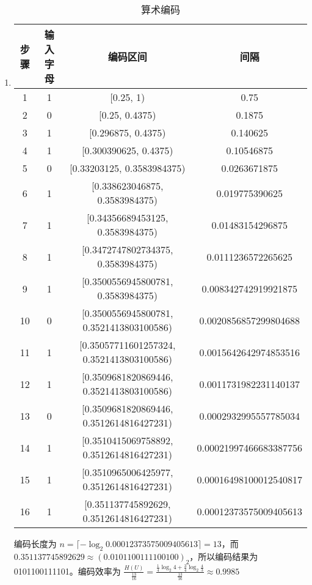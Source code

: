 \documentclass{ctexart}
\begin{document}
\begin{enumerate}
    \item\begin{table}[H]
        \centering
        \caption{算术编码}
        \begin{tabular}{cccc}
            \hline
            步骤 & 输入字母 & 编码区间 & 间隔 \\
            \hline
            1 & 1 & [0.25, 1) & 0.75 \\
            2 & 0 & [0.25, 0.4375) & 0.1875 \\
            3 & 1 & [0.296875, 0.4375) & 0.140625 \\
            4 & 1 & [0.300390625, 0.4375) & 0.10546875 \\
            5 & 0 & [0.33203125, 0.3583984375) & 0.0263671875 \\
            6 & 1 & [0.338623046875, 0.3583984375) & 0.019775390625 \\
            7 & 1 & [0.34356689453125, 0.3583984375) & 0.01483154296875 \\
            8 & 1 & [0.3472747802734375, 0.3583984375) & 0.0111236572265625 \\
            9 & 1 & [0.3500556945800781, 0.3583984375) & 0.008342742919921875 \\
            10 & 0 & [0.3500556945800781, 0.3521413803100586) & 0.0020856857299804688 \\
            11 & 1 & [0.35057711601257324, 0.3521413803100586) & 0.0015642642974853516 \\
            12 & 1 & [0.3509681820869446, 0.3521413803100586) & 0.0011731982231140137 \\
            13 & 0 & [0.3509681820869446, 0.3512614816427231) & 0.0002932995557785034 \\
            14 & 1 & [0.3510415069758892, 0.3512614816427231) & 0.00021997466683387756 \\
            15 & 1 & [0.3510965006425977, 0.3512614816427231) & 0.00016498100012540817 \\
            16 & 1 & [0.351137745892629, 0.3512614816427231) & 0.00012373575009405613 \\
            \hline
        \end{tabular}
    \end{table}
    编码长度为 $n = \lceil -\log_2 0.00012373575009405613 \rceil = 13$，而 $0.351137745892629 \approx (0.0101100111100100)_2$，所以编码结果为 0101100111101。编码效率为 $\frac{H(U)}{\frac{13}{16}} = \frac{\frac{1}{4}\log_2 4 + \frac{3}{4}\log_2\frac{4}{3}}{\frac{13}{16}} \approx 0.9985$

\end{enumerate}
\end{document}
